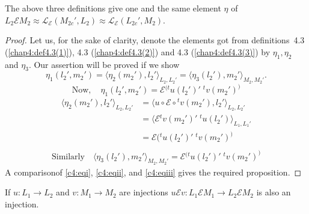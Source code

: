 \begin{prop}\label{chap4:prop4.2}
The above three definitions give one and the same element $\eta$ of
$L_2 \mathcal{E} M_2 \approx \mathscr{L}_\mathcal{E} (M_{2c}', L_2)
\approx \mathscr{L}_\mathcal{E} (L_{2c}', M_2)$.
\end{prop}

\begin{proof}
Let us, for the sake of clarity, denote the elements got from
definitions~4.3 (\ref{chap4:def4.3(1)}), 4.3 (\ref{chap4:def4.3(2)}) and
4.3 (\ref{chap4:def4.3(3)}) by $\eta_1, \eta_2$ and
$\eta_3$. Our assertion will be proved if we show 
$$\eta _1(l_2', m_2') = \langle \eta_2(m_2'), l_2'\rangle_{L_2, L_2'} =
\langle \eta_3(l_2'), m_2'\rangle_{M_2, M_2'}.
$$
\begin{equation*}
\text{Now},\quad\eta_1(l_2',m_2') =\mathscr{E}{}^{(t}u(l_2')'\;{}^t v(m_2')^)
\tag{i}\label{c4:eqi}
\end{equation*}
\begin{align*}
\langle\eta_2(m_2'), l_2'\rangle_{L_2, L_2'}  
&= \langle u \circ \mathscr{E}\circ{}^tv(m_2'), l_2'\rangle_{L_2, L_2'}\\
&= \langle \mathscr{E}{}^ tv(m_2')'\;{}^tu(l_2')\rangle_{L_1, L_1'}\\
&= \mathscr{E}({}^tu(l_2')'\;{}^tv(m_2')^)\tag{ii}\label{c4:eqii}\\
\end{align*}
\begin{align*}
\text{Similarly}\quad \langle \eta_3(l_2'), m_2'\rangle_{M_2, M_2'} =
\mathscr{E} {}^{(t}u(l_2')'\;{}^tv(m_2')^)\tag{iii}\label{c4:eqiii} 
\end{align*}
A comparison\pageoriginale of \eqref{c4:eqi}, \eqref{c4:eqii}, and 
\eqref{c4:eqiii} gives the required proposition. 
\end{proof}

\begin{prop}\label{chap4:prop4.3}
If $u : L_1 \to L_2$ and $v : M_1 \to M_2$ are injections $u
\mathcal{E} v : L_1 \mathcal{E} M_1 \to L_2 \mathcal{E} M_2$ is also
an injection.
\end{prop}

